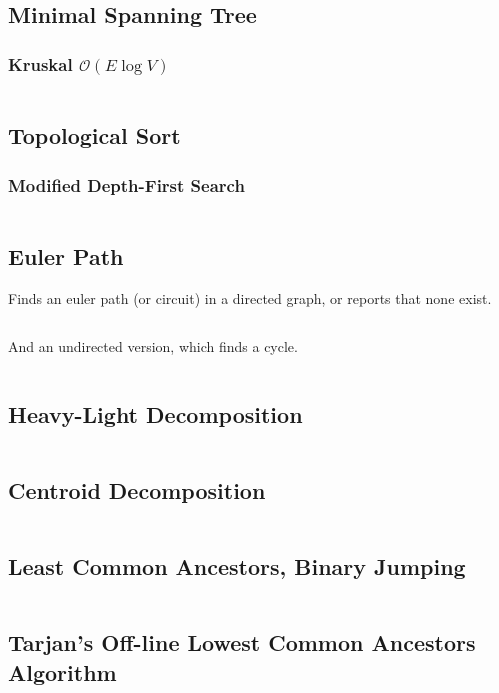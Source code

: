 \documentclass[8pt,a4paper,landscape,oneside]{amsart}
\newcommand{\code}[1]{\inputminted[fontsize=\normalsize,baselinestretch=1,breaklines,tabsize=2]{cpp}{code/#1}}
\begin{document}
\begin{multicols*}{3}
\subsection{Minimal Spanning Tree}

\subsubsection{Kruskal $\mathcal{O}(E \log V)$}
\code{graphs/mst_kruskal.cpp}

\subsection{Topological Sort}
\subsubsection{Modified Depth-First Search}
\code{graphs/tsort.cpp}

\subsection{Euler Path}
Finds an euler path (or circuit) in a directed graph, or reports that none exist.
\code{graphs/euler_path.cpp}
And an undirected version, which finds a cycle.
\code{graphs/euler_path_undirected.cpp}

\subsection{Heavy-Light Decomposition}
\code{graphs/hld.cpp}

\subsection{Centroid Decomposition}
\code{graphs/centroid_decomposition.cpp}

\subsection{Least Common Ancestors, Binary Jumping}
\code{graphs/lca.cpp}

\subsection{Tarjan's Off-line Lowest Common Ancestors Algorithm}
\code{graphs/tarjan_olca.cpp}


\end{multicols*}
\end{document}
